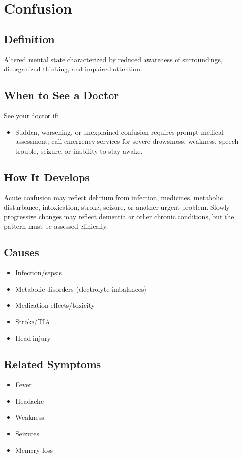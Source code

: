 \chapter{Confusion}

\section*{Definition}
Altered mental state characterized by reduced awareness of surroundings, disorganized thinking, and impaired attention.

\section*{When to See a Doctor}
See your doctor if:
\begin{itemize}
  \item Sudden, worsening, or unexplained confusion requires prompt medical assessment; call emergency services for severe drowsiness, weakness, speech trouble, seizure, or inability to stay awake.
\end{itemize}

\section*{How It Develops}
Acute confusion may reflect delirium from infection, medicines, metabolic disturbance, intoxication, stroke, seizure, or another urgent problem. Slowly progressive changes may reflect dementia or other chronic conditions, but the pattern must be assessed clinically.

\section*{Causes}
\begin{itemize}
  \item Infection/sepsis
  \item Metabolic disorders (electrolyte imbalances)
  \item Medication effects/toxicity
  \item Stroke/TIA
  \item Head injury
\end{itemize}

\section*{Related Symptoms}
\begin{itemize}
  \item Fever
  \item Headache
  \item Weakness
  \item Seizures
  \item Memory loss
\end{itemize}


